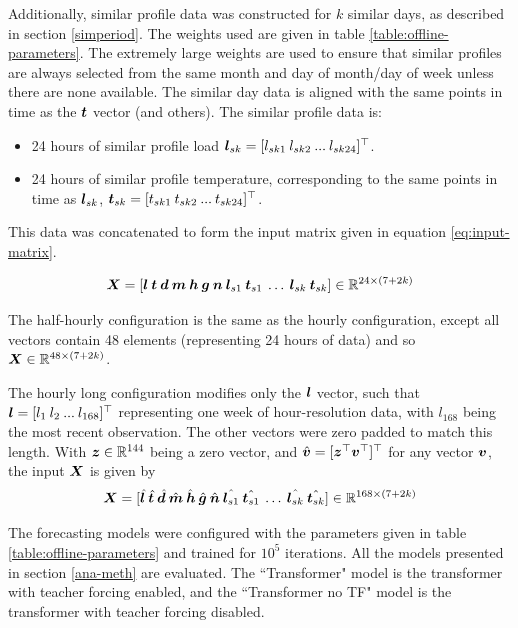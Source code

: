 Additionally, similar profile data was constructed for $k$ similar days, as described in section \ref{simperiod}.
The weights used are given in table \ref{table:offline-parameters}.
The extremely large weights are used to ensure that similar profiles are always selected from the same month and day of month/day of week unless there are none available.
The similar day data is aligned with the same points in time as the ${\bm{t}}$ vector (and others).
The similar profile data is:

\begin{itemize}
	\item 24 hours of similar profile load ${\bm{l}}_{sk} = [ l_{sk1} \: l_{sk2} \: ... \: l_{sk24}]^\top$.
	\item 24 hours of similar profile temperature, corresponding to the same points in time as ${\bm{l}}_{sk}$, ${\bm{t}}_{sk} = [ t_{sk1} \: t_{sk2} \: ...  \: t_{sk24}]^\top$.
\end{itemize}

This data was concatenated to form the input matrix given in equation \ref{eq:input-matrix}.

\begin{equation} \label{eq:input-matrix}
{\bm{X}} = [ {\bm{l}} \: {\bm{t}} \: {\bm{d}} \: {\bm{m}} \: {\bm{h}} \: {\bm{g}} \: {\bm{n}} \: {\bm{l}}_{s1} \: {\bm{t}}_{s1} \: \ldots \: {\bm{l}}_{sk} \: {\bm{t}}_{sk}] \in \mathbb{R}^{24 \times (7 + 2k)}
\end{equation}

The half-hourly configuration is the same as the hourly configuration, except all vectors contain 48 elements (representing 24 hours of data) and so ${\bm{X}} \in \mathbb{R}^{48 \times (7 + 2k)}$.

The hourly long configuration modifies only the ${\bm{l}}$ vector, such that ${\bm{l}} = [ l_1 \: l_2 \: ...  \: l_{168}]^\top$ representing one week of hour-resolution data, with $l_{168}$ being the most recent observation.
The other vectors were zero padded to match this length.
With ${\bm{z}} \in \mathbb{R}^{144}$ being a zero vector, and $\hat{{\bm{v}}} = [{\bm{z}}^\top {\bm{v}}^\top]^\top$ for any vector ${\bm{v}}$, the input ${\bm{X}}$ is given by
\begin{equation}
{\bm{X}} = [ \hat{{\bm{l}}} \: \hat{{\bm{t}}} \: \hat{{\bm{d}}} \: \hat{{\bm{m}}} \: \hat{{\bm{h}}} \: \hat{{\bm{g}}} \: \hat{{\bm{n}}} \: \hat{{\bm{l}}_{s1}} \: \hat{{\bm{t}}_{s1}} \: \ldots \: \hat{{\bm{l}}_{sk}} \: \hat{{\bm{t}}_{sk}}] \in \mathbb{R}^{168 \times (7 + 2k)}
\end{equation}

The forecasting models were configured with the parameters given in table \ref{table:offline-parameters} and trained for $10^5$ iterations.
All the models presented in section \ref{ana-meth} are evaluated.
The ``Transformer" model is the transformer with teacher forcing enabled, and the ``Transformer no TF" model is the transformer with teacher forcing disabled.

